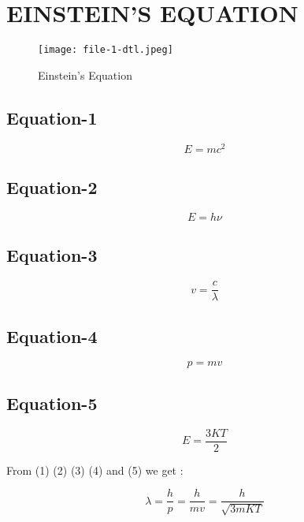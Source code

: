 \documentclass{article}
\begin{document}
\section{EINSTEIN'S EQUATION}

\begin{figure}
\texttt{[image: file-1-dtl.jpeg]}
\caption{Einstein's Equation}
\label{fig:Einstein's Equation}
\end{figure}

\subsection{Equation-1}
\begin{equation}
	E=mc^2
\end{equation}

\subsection{Equation-2}

\begin{equation}
	E=h\nu
\end{equation}

\subsection{Equation-3}

\begin{equation}
	v=\frac{c}{\lambda}
\end{equation}

\subsection{Equation-4}

\begin{equation}
	p=mv
\end{equation}

\subsection{Equation-5}

\begin{equation}
	E = \frac{3KT}{2}
\end{equation}

From (1) (2) (3) (4) and (5) we get :

\begin{equation*}
	\lambda = \frac{h}{p} = \frac{h}{mv} = \frac{h}{\sqrt{3mKT}}
\end{equation*}
\end{document}
